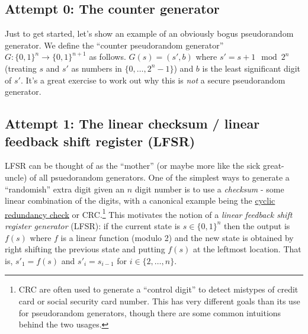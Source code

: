\subsection{Attempt 0: The counter
generator}\label{Attempt--The-counter-generator}

Just to get started, let's show an example of an obviously bogus
pseudorandom generator. We define the ``counter pseudorandom generator''
\(G:\{0,1\}^n \rightarrow \{0,1\}^{n+1}\) as follows. \(G(s)=(s',b)\)
where \(s' = s + 1 \mod 2^n\) (treating \(s\) and \(s'\) as numbers in
\(\{0,\ldots,2^n-1\}\)) and \(b\) is the least significant digit of
\(s'\). It's a great exercise to work out why this is \emph{not} a
secure pseudorandom generator.


\subsection{Attempt 1: The linear checksum / linear feedback shift
register (LFSR)}\label{Attempt--The-linear-checksum--}

LFSR can be thought of as the ``mother'' (or maybe more like the sick
great-uncle) of all psuedorandom generators. One of the simplest ways to
generate a ``randomish'' extra digit given an \(n\) digit number is to
use a \emph{checksum} - some linear combination of the digits, with a
canonical example being the
\href{https://en.wikipedia.org/wiki/Cyclic_redundancy_check}{cyclic
redundancy check} or CRC.\footnote{CRC are often used to generate a
  ``control digit'' to detect mistypes of credit card or social security
  card number. This has very different goals than its use for
  pseudorandom generators, though there are some common intuitions
  behind the two usages.} This motivates the notion of a \emph{linear
feedback shift register generator} (LFSR): if the current state is
\(s\in\{0,1\}^n\) then the output is \(f(s)\) where \(f\) is a linear
function (modulo 2) and the new state is obtained by right shifting the
previous state and putting \(f(s)\) at the leftmost location. That is,
\(s'_1 = f(s)\) and \(s'_i = s_{i-1}\) for \(i\in\{2,\ldots,n\}\).

